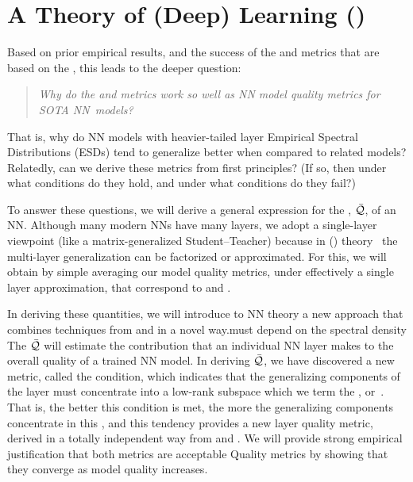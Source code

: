 \section{A \SemiEmpirical Theory of (Deep) Learning (\SETOL)}
\label{sxn:setol}
Based on prior empirical results, and the success of the \ALPHA and \ALPHAHAT metrics that are based on the \HTSR \Phenomenology, this leads to the deeper question: 
%
\begin{quote}
\emph{Why do the \ALPHA and \ALPHAHAT metrics work so well as NN model quality metrics for SOTA NN~models?}
\end{quote}
That is, why do NN models with heavier-tailed layer Empirical Spectral Distributions  (ESDs) tend to generalize better when compared to related models?
Relatedly, can we derive these metrics from first principles?
(If so, then under what conditions do they hold, and under what conditions do they fail?)

\noindent
To answer these questions, we will derive a general expression for the \LayerQuality, $\bar{\mathcal{Q}}$, of an NN.
Although many modern NNs have many layers, we adopt a single-layer viewpoint (like a matrix-generalized Student–Teacher) because in \StatisticalMechanicsOfGeneralization (\SMOG) theory~\cite{SST92,STS90} the multi-layer generalization can be factorized or approximated.
For this, we will obtain by simple averaging our model quality metrics, under effectively a single layer approximation, that correspond to \ALPHA and \ALPHAHAT.


In deriving these quantities, we will introduce to NN theory a new \SemiEmpirical approach that combines techniques from \STATMECH and \RMT in a novel way.must depend on the spectral density
The \LayerQuality $\bar{\mathcal{Q}}$ will estimate the contribution that an individual NN layer makes to the overall quality of a trained NN model.
In deriving $\bar{\mathcal{Q}}$, we have discovered a new \LayerQuality metric, called the \TRACELOG condition,
which indicates that the generalizing components of the layer must concentrate into a low-rank subspace which we term the \emph{\EffectiveCorrelationSpace}, or~\ECS. That is, the better this condition is met, the more the generalizing components concentrate in this \ECS, and this tendency provides a new layer quality metric, derived in a totally independent way from \ALPHA and \ALPHAHAT. We will provide strong empirical justification that both metrics are acceptable Quality metrics by showing that they converge as model quality increases.

